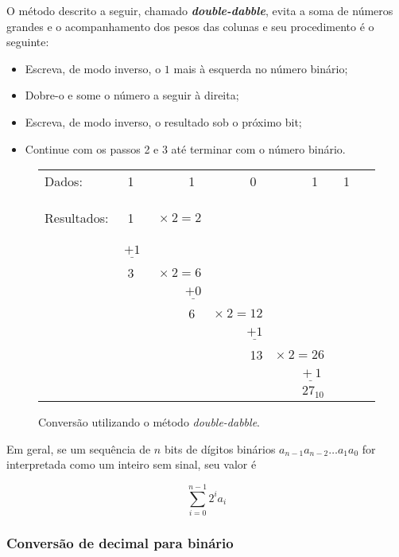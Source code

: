 O método descrito a seguir, chamado {\em\bf double-dabble}, evita a
soma de números grandes e o acompanhamento dos pesos das colunas e seu
procedimento é o seguinte:

\begin{itemize}
\item Escreva, de modo inverso, o $1$ mais à esquerda no número binário;
\item Dobre-o e some o número a seguir à direita;
\item Escreva, de modo inverso, o resultado sob o próximo bit;
\item Continue com os passos 2 e 3 até terminar com o número binário.
\end{itemize}

\begin{figure}[ht]
  \begin{tabular}{|l|r|r|r|r|r|r|}
    Dados: & {\ 1\ } & {\ 1\ } & {\ 0\ } & {\ 1\ } & {\ 1\ } \\
    Resultados: & {\ 1\ } &{\ } $\times\ 2 = 2${\ } & & & & \\
    & $\underline{+1}$ &  & & &  \\
    & {\ 3\ } & $\times\ 2 = 6$& & &  \\
    &  & $\underline{+0}$& & &  \\
    & & {\ 6\ } & $\times\ 2 = 12$& &  \\
    & & & $\underline{+1}$ & &   \\
    & & & {\ 13} & $\times\ 2 = 26$&   \\
    & & &  & $\underline{\ +1\ }$ &   \\
    & & &  & {\bf $27_{10}$} &   \\
  \end{tabular}
  
  \caption{Conversão utilizando o método {\em double-dabble}.}
  \label{fig:bin2dec}
\end{figure}
              
Em geral, se um sequência de $n$ bits de dígitos binários
$a_{n-1}a_{n-2}\ldots a_1a_0$ for interpretada como um inteiro sem
sinal, seu valor é

\begin{equation}
\sum_{i=0}^{n-1}2^ia_i
\end{equation}

\subsubsection{Conversão de decimal para binário}
\label{sec:dec2bin}


